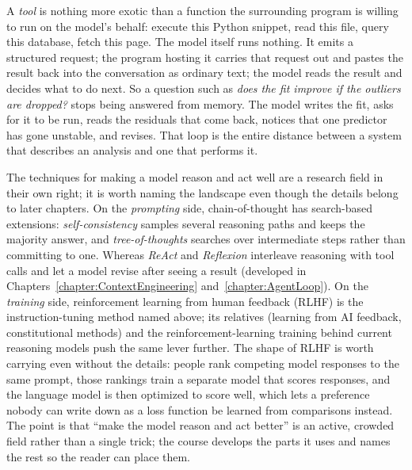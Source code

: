 \begin{example}
A \emph{tool} is nothing more exotic than a function the surrounding program is willing to run on the model's behalf: execute this Python snippet, read this file, query this database, fetch this page.
The model itself runs nothing.
It emits a structured request; the program hosting it carries that request out and pastes the result back into the conversation as ordinary text; the model reads the result and decides what to do next.
So a question such as \emph{does the fit improve if the outliers are dropped?} stops being answered from memory.
The model writes the fit, asks for it to be run, reads the residuals that come back, notices that one predictor has gone unstable, and revises.
That loop is the entire distance between a system that describes an analysis and one that performs it.
\end{example}

The techniques for making a model reason and act well are a research field in their own right; it is worth naming the landscape even though the details belong to later chapters.
On the \emph{prompting} side, chain-of-thought has search-based extensions: \emph{self-consistency} samples several reasoning paths and keeps the majority answer, and \emph{tree-of-thoughts} searches over intermediate steps rather than committing to one.
Whereas \emph{ReAct} and \emph{Reflexion} interleave reasoning with tool calls and let a model revise after seeing a result (developed in Chapters~\ref{chapter:ContextEngineering} and~\ref{chapter:AgentLoop}).
On the \emph{training} side, reinforcement learning from human feedback (RLHF) is the instruction-tuning method named above; its relatives (learning from AI feedback, constitutional methods) and the reinforcement-learning training behind current reasoning models push the same lever further.
The shape of RLHF is worth carrying even without the details: people rank competing model responses to the same prompt, those rankings train a separate model that scores responses, and the language model is then optimized to score well, which lets a preference nobody can write down as a loss function be learned from comparisons instead.
The point is that ``make the model reason and act better'' is an active, crowded field rather than a single trick; the course develops the parts it uses and names the rest so the reader can place them.

